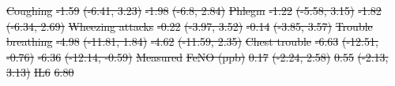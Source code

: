 \documentclass[
  letterpaper,
  DIV=11,
  numbers=noendperiod]{scrartcl}
\makeatletter
\renewenvironment{table}%
   {\renewcommand\familydefault\sfdefault
    \@float{table}}
   {\end@float}
\providecommand{\DIFdeltex}[1]{{\protect\color{red}\sout{#1}}}                      %
\providecommand{\DIFdelFL}[1]{\DIFdel{#1}} %
\providecommand{\DIFdel}[1]{\texorpdfstring{\DIFdeltex{#1}}{}} %
\makeatother
\begin{document}
\begin{table}
\DIFdelFL{\hspace{1em} }%
\DIFdelFL{Coughing }%
\DIFdelFL{-1.59 }%
\DIFdelFL{(-6.41, 3.23) }%
\DIFdelFL{-1.98 }%
\DIFdelFL{(-6.8, 2.84)}%
\DIFdelFL{\hspace{1em} }%
\DIFdelFL{Phlegm }%
\DIFdelFL{-1.22 }%
\DIFdelFL{(-5.58, 3.15) }%
\DIFdelFL{-1.82 }%
\DIFdelFL{(-6.34, 2.69)}%
\DIFdelFL{\hspace{1em} }%
\DIFdelFL{Wheezing attacks }%
\DIFdelFL{-0.22 }%
\DIFdelFL{(-3.97, 3.52) }%
\DIFdelFL{-0.14 }%
\DIFdelFL{(-3.85, 3.57)}%
\DIFdelFL{\hspace{1em} }%
\DIFdelFL{Trouble breathing }%
\DIFdelFL{-4.98 }%
\DIFdelFL{(-11.81, 1.84) }%
\DIFdelFL{-4.62 }%
\DIFdelFL{(-11.59, 2.35)}%
\DIFdelFL{Chest trouble }%
\DIFdelFL{-6.63 }%
\DIFdelFL{(-12.51, -0.76) }%
\DIFdelFL{-6.36 }%
\DIFdelFL{(-12.14, -0.59)}%
\DIFdelFL{\hspace{1em}Measured }%
\DIFdelFL{FeNO (ppb) }%
\DIFdelFL{0.17 }%
\DIFdelFL{(-2.24, 2.58) }%
\DIFdelFL{0.55 }%
\DIFdelFL{(-2.13, 3.13)}%
\DIFdelFL{\hspace{1em} }%
\DIFdelFL{IL6 }%
\DIFdelFL{6.80 }%

\end{table}
\end{document}

